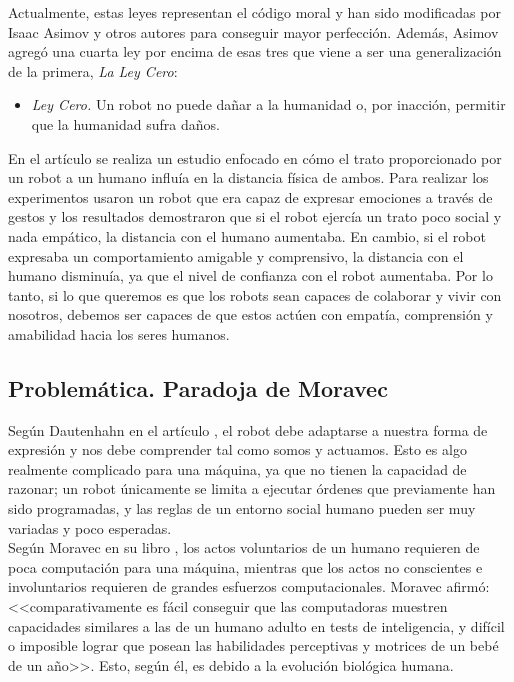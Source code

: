 Actualmente, estas leyes representan el código moral y han sido modificadas por Isaac Asimov y otros autores para conseguir mayor perfección. Además, Asimov agregó una cuarta ley por encima de esas tres que viene a ser una generalización de la primera, \textit{La Ley Cero}:

\begin{itemize}
    \item \textit{Ley Cero.} Un robot no puede dañar a la humanidad o, por inacción, permitir que la humanidad sufra daños.
\end{itemize}

En el artículo \cite{hri_distancing} se realiza un estudio enfocado en cómo el trato proporcionado por un robot a un humano influía en la distancia física de ambos. Para realizar los experimentos usaron un robot que era capaz de expresar emociones a través de gestos y los resultados demostraron que si el robot ejercía un trato poco social y nada empático, la distancia con el humano aumentaba. En cambio, si el robot expresaba un comportamiento amigable y comprensivo, la distancia con el humano disminuía, ya que el nivel de confianza con el robot aumentaba. Por lo tanto, si lo que queremos es que los robots sean capaces de colaborar y vivir con nosotros, debemos ser capaces de que estos actúen con empatía, comprensión y amabilidad hacia los seres humanos.

\subsection{Problemática. Paradoja de Moravec}

Según Dautenhahn en el artículo \cite{hri_dautenhahn}, el robot debe adaptarse a nuestra forma de expresión y nos debe comprender tal como somos y actuamos. Esto es algo realmente complicado para una máquina, ya que no tienen la capacidad de razonar; un robot únicamente se limita a ejecutar órdenes que previamente han sido programadas, y las reglas de un entorno social humano pueden ser muy variadas y poco esperadas.\\

Según Moravec en su libro \cite{moravec}, los actos voluntarios de un humano requieren de poca computación para una máquina, mientras que los actos no conscientes e involuntarios requieren de grandes esfuerzos computacionales. Moravec afirmó: <<comparativamente es fácil conseguir que las computadoras muestren capacidades similares a las de un humano adulto en tests de inteligencia, y difícil o imposible lograr que posean las habilidades perceptivas y motrices de un bebé de un año>>. Esto, según él, es debido a la evolución biológica humana.\\

